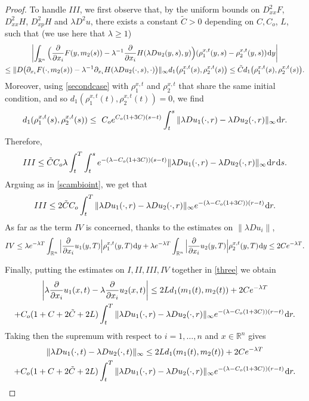 \documentclass{amsart}
\theoremstyle{remark}
\theoremstyle{definition}
\theoremstyle{Claim}
\newcommand{\R}{\mathbb{R}}
\newcommand{\dd}{\hspace{0.7pt}{\rm d}}
\theoremstyle{plain}
\begin{document}
\begin{proof}
	\smallskip
	
	To handle $III$, we first observe that, by the uniform bounds on {$D^2_{xx} F$, $D^2_{xx} H$, $D^2_{xp}H$ and $\lambda D^2 u$, there exists a constant $\tilde C > 0$ depending on $C, C_o$, $L$}, such that (we use here that $\lambda \ge 1$)
	\begin{multline*}
	\left| \int_{\R^n} \Big( \frac{\partial}{\partial x_i} F(y,m_2(s)) - \lambda^{-1} \frac{\partial}{\partial x_i} H(\lambda Du_2(y,s),y) \Big) (\rho_1^{x, t}(y,s) - \rho_2^{x, t}(y,s)) \dd y \right| \\\le
	 \|D \big(\partial_{x_i} F(\cdot,m_2(s)) - \lambda^{-1} \partial_{x_i} H(\lambda Du_2(\cdot,s),\cdot) \big) \|_\infty d_1\big(\rho_1^{x, t}(s), \rho_2^{x, t}(s)\big) \le \tilde C d_1\big(\rho_1^{x, t}(s), \rho_2^{x, t}(s)\big).
	\end{multline*}
	Moreover, using \eqref{secondcase} with $\rho_1^{x, t}$ and $\rho_2^{x, t}$ that share the same initial condition, and so $d_1(\rho_1^{x, t}(t), \rho_2^{x, t}(t))=0$, we find
	\[
d_1(\rho_1^{x, t}(s), \rho_2^{x, t}(s))\le \ {C_o} e^{ {C_o(1+3C)}(s-t)} \int_t^s  \| \lambda D u_1(\cdot,r) - \lambda D u_2(\cdot,r) \|_\infty \dd r.
	\]
	Therefore,
	\[
	III \le  \tilde C {C_o} \lambda \int_t^{T}  \int_t^s e^{-(\lambda - {C_o(1+3C)}) (s-t)}   \| \lambda D u_1(\cdot,r) - \lambda D u_2(\cdot,r) \|_\infty\dd r  \dd s.
	\]
	Arguing as in \eqref{scambioint}, we get that
	\[
	III \le 2 \tilde C  {C_o} \int_{t}^{T} \| \lambda D u_1(\cdot,r) - \lambda D u_2(\cdot,r) \|_\infty e^{-(\lambda - {C_o(1+3C)}) (r-t)}  \dd r.
	\]
As far as the term $IV$ is concerned, thanks to the estimates on $\|\lambda Du_i\|$,
		\[
			IV\le \lambda e^{-\lambda T}\int_{\R^n}\Big| \frac{\partial}{\partial x_i}u_1(y,T) \Big|\rho_1^{x, t}(y,T) \dd y+ \lambda e^{-\lambda T}\int_{\R^n}\Big| \frac{\partial}{\partial x_i}u_2(y,T) \Big|\rho_2^{x, t}(y,T) \dd y \le 2Ce^{-\lambda T}.
		\] 

\smallskip

Finally, putting the estimates on $I, II, III, IV$ together in \eqref{three} we obtain
	\begin{multline*}
	\left|\lambda \frac{\partial }{\partial x_i}u_1(x,t) - \lambda \frac{\partial }{\partial x_i} u_2(x,t)\right| \le
	2L  d_1(m_1(t), m_2(t))+ 2Ce^{-\lambda T} \\+
	{C_o(1+C+2\tilde{C}+2L)} \int_{t}^{T} \| \lambda D u_1(\cdot,r) - \lambda D u_2(\cdot,r) \|_\infty e^{-(\lambda - {C_o(1+3C)}) (r-t)}  \dd r.
	\end{multline*}
	Taking then  the supremum with respect to $i=1,\dots,n$ and $x\in \mathbb{R}^n$ gives
	\begin{multline*}
	 \| \lambda D u_1(\cdot,t) - \lambda D u_2(\cdot,t) \|_\infty  \le
	2L  d_1(m_1(t), m_2(t))  + 2Ce^{-\lambda T}\\+
	{C_o(1+C+2\tilde{C}+2L)}\int_{t}^{T} \| \lambda D u_1(\cdot,r) - \lambda D u_2(\cdot,r) \|_\infty e^{-(\lambda -  {C_o(1+3C)}) (r-t)}  \dd r.
	\end{multline*}
	

\end{proof}
\end{document}
